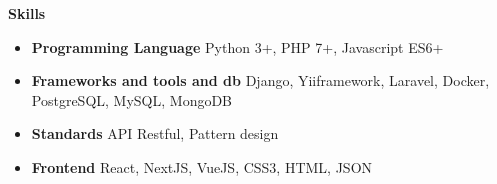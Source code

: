 \documentclass[letterpaper,12pt]{article}[leftmargin=*]
\makeatletter
\def \entryspacing {-0pt}
\renewcommand{\section}[2]{\vspace{5pt}
  \colorbox{secondary}{\color{white}\raggedbottom\normalsize\textbf{{#1}{\hspace{7pt}#2}}}
}
\newcommand{\resumeEntryStart}{\begin{itemize}[leftmargin=2.5mm]}
\newcommand{\resumeEntryEnd}{\end{itemize}\vspace{\entryspacing}}
\newcommand{\resumeItemListStart}{\begin{itemize}[leftmargin=4.5mm]}
\newcommand{\resumeItemListEnd}{\end{itemize}}
\newcommand{\resumeItem}[1]{
  \item\small{
    {#1 \vspace{-2pt}}
  }
}
\newcommand{\resumeEntryTD}[2]{
  \vspace{-1pt}\item[]
    \begin{tabularx}{0.97\textwidth}{X@{\hspace{60pt}}r}
      \textbf{\color{primary}#1} & {\firabook\color{accent}\small#2} \\
    \end{tabularx}\vspace{-6pt}
}
\newcommand{\resumeEntryS}[2]{
  \item[]\small{
    \textbf{\color{primary}#1 }{ #2 \vspace{-6pt}}
  }
}
\makeatother
\begin{document}



\section{\faGears}{Skills}
 \resumeEntryStart
  \resumeEntryS{Programming Language } {Python 3+, PHP 7+, Javascript ES6+ }
  \resumeEntryS{Frameworks and tools and db} {Django, Yiiframework, Laravel, Docker, PostgreSQL, MySQL, MongoDB}
  \resumeEntryS{Standards } {API Restful, Pattern design}
  \resumeEntryS{Frontend } {React, NextJS, VueJS, CSS3, HTML, JSON}
 \resumeEntryEnd
\end{document}
